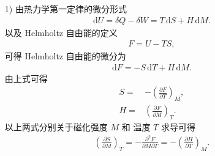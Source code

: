 \documentclass{assignment}
\begin{document}
\begin{sol}
    \begin{itemize}
        \item[1)] 由热力学第一定律的微分形式
        \begin{align}
            \mathrm{d}U=\delta Q-\delta W=T\,\mathrm{d}S+H\,\mathrm{d}M.
        \end{align}
        以及 Helmholtz 自由能的定义
        \begin{align}
            F=U-TS,
        \end{align}
        可得 Helmholtz 自由能的微分为
        \begin{align}
            \mathrm{d}F=-S\,\mathrm{d}T+H\,\mathrm{d}M.
        \end{align}
        由上式可得
        \begin{align}
            S=&-\left(\frac{\partial F}{\partial T}\right)_M,\\
            H=&\left(\frac{\partial F}{\partial M}\right)_T.
        \end{align}
        以上两式分别关于磁化强度 $M$ 和 温度 $T$ 求导可得
        \begin{align}
            \label{1-dS/dM=-dH/dT}
            \left(\frac{\partial S}{\partial M}\right)_T=-\frac{\partial^2F}{\partial M\partial T}=-\left(\frac{\partial H}{\partial T}\right)_M.
        \end{align}


\end{itemize}
\end{sol}
\end{document}
